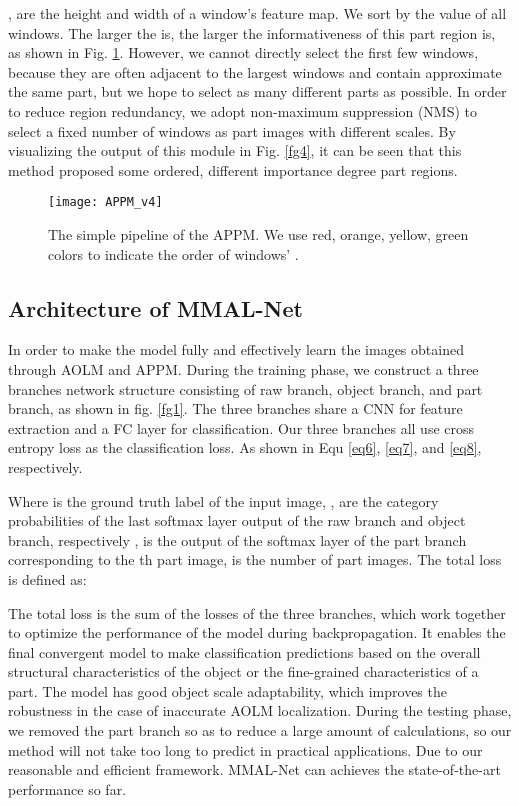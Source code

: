 \documentclass[runningheads]{llncs}
\begin{document}
 ,  are the height and width of a window's feature map. We sort by the  value of all windows. The larger the  is, the larger the informativeness of this part region is, as shown in Fig. \ref {fg3}. However, we cannot directly select the first few windows, because they are often adjacent to the largest  windows and contain approximate the same part, but we hope to select as many different parts as possible. In order to reduce region redundancy, we adopt non-maximum suppression (NMS) to select a fixed number of windows as part images with different scales. By visualizing the output of this module in Fig. \ref {fg4}, it can be seen that this method proposed some ordered, different importance degree part regions.
\begin{figure}
\texttt{[image: APPM\_v4]}
\caption{The simple pipeline of the APPM. We use red, orange, yellow, green colors to indicate the order of windows' .} \label{fg3}
\end{figure}
\subsection{Architecture of MMAL-Net}
In order to make the model fully and effectively learn the images obtained through AOLM and APPM. During the training phase, we construct a three branches network structure consisting of raw branch, object branch, and part branch, as shown in fig. \ref {fg1}. The three branches share a CNN for feature extraction and a FC layer for classification. Our three branches all use cross entropy loss as the classification loss. As shown in Equ \ref{eq6}, \ref{eq7}, and \ref{eq8}, respectively.



Where  is the ground truth label of the input image, ,  are the category probabilities of the last softmax layer output of the raw branch and object branch, respectively ,  is the output of the softmax layer of the part branch corresponding to the th part image,  is the number of part images. The total loss is defined as:

The total loss is the sum of the losses of the three branches, which work together to optimize the performance of the model during backpropagation. It enables the final convergent model to make classification predictions based on the overall structural characteristics of the object or the fine-grained characteristics of a part. The model has good object scale adaptability, which improves the robustness in the case of inaccurate AOLM localization. During the testing phase, we removed the part branch so as to reduce a large amount of calculations, so our method will not take too long to predict in practical applications. Due to our reasonable and efficient framework. MMAL-Net can achieves the state-of-the-art performance so far.
\end{document}
